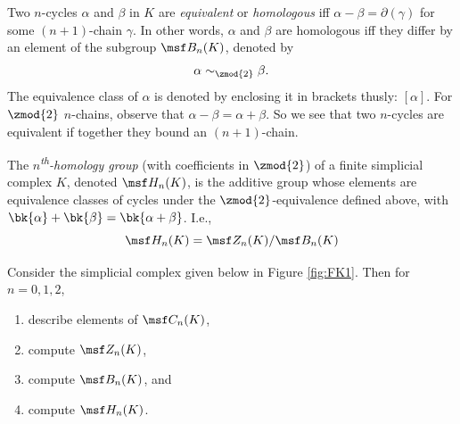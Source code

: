 \begin{definition}
  Two $n$-cycles $\alpha$ and $\beta$ in $K$ are \emph{equivalent} or
  \emph{homologous} iff $\alpha-\beta = \partial(\gamma)$ for some $(n+1)$-chain
  $\gamma$. In other words, $\alpha$ and $\beta$ are homologous iff they differ
  by an element of the subgroup $\msf B_n(K)$, denoted by
  \[
    \alpha \sim_{\zmod{2}} \beta.
  \]
  The equivalence class of $\alpha$ is denoted by enclosing it in brackets
  thusly: $[\alpha]$. For $\zmod{2}$ $n$-chains, observe that $\alpha - \beta =
  \alpha + \beta$. So we see that two $n$-cycles are equivalent if together they
  bound an $(n+1)$-chain.
\end{definition}
\begin{definition}
  The \emph{$n$\textsuperscript{th}-homology group} (with coefficients in
  $\zmod{2}$) of a finite simplicial complex $K$, denoted $\msf H_n(K)$, is the
  additive group whose elements are equivalence classes of cycles under the
  $\zmod{2}$-equivalence defined above, with $\bk{\alpha} + \bk{\beta} =
  \bk{\alpha +\beta}$. I.e.,
  \[
    \msf H_n(K) = \msf Z_n(K)/\msf B_n(K)
  \]
\end{definition}
\begin{problem}[F1]
  Consider the simplicial complex given below in Figure \cref{fig:FK1}. Then for
  $n = 0, 1, 2$,
  \begin{enumerate}
  \item describe elements of $\msf C_n(K)$,
  \item compute $\msf Z_n(K)$,
  \item compute $\msf B_n(K)$, and
  \item compute $\msf H_n(K)$.
  \end{enumerate}
\end{problem}
